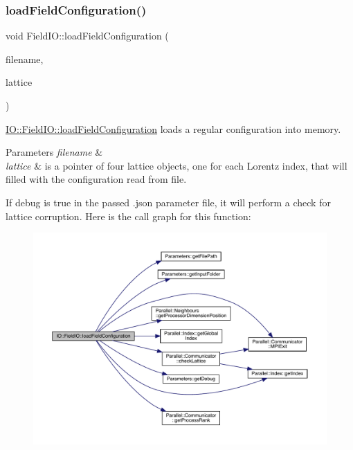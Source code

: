\subsubsection{\texorpdfstring{loadFieldConfiguration()}{loadFieldConfiguration()}}
{\footnotesize\ttfamily void Field\+I\+O\+::load\+Field\+Configuration (\begin{DoxyParamCaption}\item[{std\+::string}]{filename,  }\item[{\mbox{\hyperlink{class_lattice}{Lattice}}$<$ \mbox{\hyperlink{class_s_u3}{S\+U3}} $>$ $\ast$}]{lattice }\end{DoxyParamCaption})\hspace{0.3cm}{\ttfamily [static]}}



\mbox{\hyperlink{class_i_o_1_1_field_i_o_a02db864a48601edd7febaab5d655e495}{I\+O\+::\+Field\+I\+O\+::load\+Field\+Configuration}} loads a regular configuration into memory. 


\begin{DoxyParams}{Parameters}
{\em filename} & \\
\hline
{\em lattice} & is a pointer of four lattice objects, one for each Lorentz index, that will filled with the configuration read from file.\\
\hline
\end{DoxyParams}
If debug is true in the passed .json parameter file, it will perform a check for lattice corruption. Here is the call graph for this function\+:
\nopagebreak
\begin{figure}[H]
\begin{center}
\leavevmode
\includegraphics[width=350pt]{class_i_o_1_1_field_i_o_a02db864a48601edd7febaab5d655e495_cgraph}
\end{center}
\end{figure}
\mbox{\label{class_i_o_1_1_field_i_o_aaf2bac2025d67c06e7c61e8cc9f44777}} 
